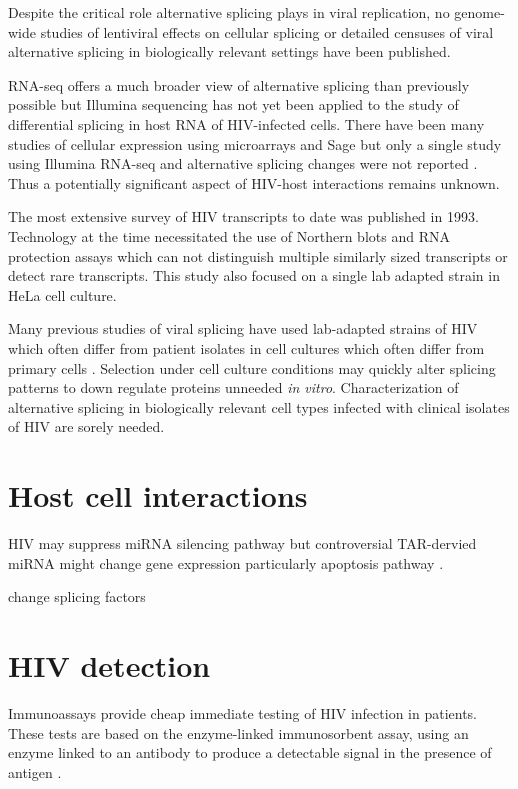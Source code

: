 \documentclass[../sherrill-Mix_thesis.tex]{subfiles}
\begin{document}
	Despite the critical role alternative splicing plays in viral replication, no genome-wide studies of lentiviral effects on cellular splicing or  detailed censuses of viral alternative splicing in biologically relevant settings have been published.

	RNA-seq offers a much broader view of alternative splicing than previously possible \citep{Trapnell2010,Rogers2012} but Illumina sequencing has not yet been applied to the study of differential splicing in host RNA of HIV-infected cells. There have been many studies of cellular expression using microarrays \citep{Vahey2002,Wout2003,Mitchell2003,Rotger2010,Miller2011} and Sage \citep{Ryo1999,Lefebvre2011} but only a single study using Illumina RNA-seq and alternative splicing changes were not reported \citep{Chang2011}. Thus a potentially significant aspect of HIV-host interactions remains unknown.

	The most extensive survey of HIV transcripts to date was published in 1993\citep{Purcell1993}. Technology at the time necessitated the use of Northern blots and RNA protection assays \citep{Purcell1993} which can not distinguish multiple similarly sized transcripts or detect rare transcripts. This study also focused on a single lab adapted \hivNL{} strain in HeLa cell culture.

	Many previous studies of viral splicing have used lab-adapted strains of HIV which often differ from patient isolates \citep{Fujita1992} in cell cultures which often differ from primary cells \citep{McAllister1971}. Selection under cell culture conditions may quickly alter splicing patterns to down regulate proteins unneeded \emph{in vitro}.  Characterization of alternative splicing in biologically relevant cell types infected with clinical isolates of HIV are sorely needed.


\section{Host cell interactions}
HIV may suppress miRNA silencing pathway \citep{Bennasser2005,Triboulet2007,Qian2009} but controversial \citep{Lin2007}
TAR-dervied miRNA might change gene expression particularly apoptosis pathway \citep{Klase2009}.

change splicing factors \citep{Zhu2002,Dowling2008}


\section{HIV detection}
	Immunoassays provide cheap immediate testing of HIV infection in patients. These tests are based on the enzyme-linked immunosorbent assay, using an enzyme linked to an antibody to produce a detectable signal in the presence of antigen \citep{Yalow1960,Engvall1971,Weemen1971}. %
	
\end{document}
